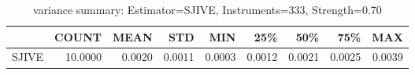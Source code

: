 \begin{table}[ht]
\centering
\caption{variance summary: Estimator=SJIVE, Instruments=333, Strength=0.70}
\begin{tabular}{lrrrrrrrr}
\toprule
 & COUNT & MEAN & STD & MIN & 25\% & 50\% & 75\% & MAX \\
\midrule
SJIVE & 10.0000 & 0.0020 & 0.0011 & 0.0003 & 0.0012 & 0.0021 & 0.0025 & 0.0039 \\
\bottomrule
\end{tabular}
\end{table}
